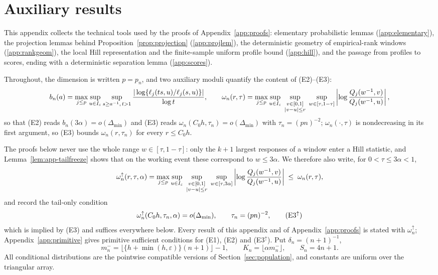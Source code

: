 \section{Auxiliary results}
\label{app:aux}
\renewcommand{\theequation}{A.\arabic{equation}}
\setcounter{equation}{0}

This appendix collects the technical tools used by the proofs of
Appendix~\ref{app:proofs}: elementary probabilistic lemmas
(\ref{app:elementary}), the projection lemmas behind
Proposition~\ref{prop:projection} (\ref{app:projlem}), the deterministic
geometry of empirical-rank windows (\ref{app:rankgeom}), the local Hill
representation and the finite-sample uniform profile bound
(\ref{app:hill}), and the passage from profiles to scores, ending with a
deterministic separation lemma (\ref{app:scores}).

Throughout, the dimension is written $p=p_n$, and two auxiliary moduli
quantify the content of (E2)--(E3):
\[
 b_n(a)=\max_{j\le p}\sup_{u\in I_\varepsilon}\sup_{s\ge a^{-1},\,t>1}
 \frac{|\log\{\ell_j(ts,u)/\ell_j(s,u)\}|}{\log t},
 \qquad
 \omega_n(r,\tau)=\max_{j\le p}
 \sup_{u\in I_\varepsilon}\;
 \sup_{\substack{v\in[0,1]\\|v-u|\le r}}\;
 \sup_{w\in[\tau,1-\tau]}
 \left|\log\frac{Q_j(w^{-1},v)}{Q_j(w^{-1},u)}\right|,
\]
so that (E2) reads $b_n(3\alpha)=o(\Delta_{\min})$ and (E3) reads
$\omega_n(C_0h,\tau_n)=o(\Delta_{\min})$ with $\tau_n=(pn)^{-2}$;
$\omega_n(\cdot,\tau)$ is nondecreasing in its first argument, so (E3)
bounds $\omega_n(r,\tau_n)$ for every $r\le C_0h$.

The proofs below never use the whole range $w\in[\tau,1-\tau]$: only the
$k+1$ largest responses of a window enter a Hill statistic, and
Lemma~\ref{lem:app-tailfreeze} shows that on the working event these
correspond to $w\le3\alpha$.  We therefore also write, for
$0<\tau\le3\alpha<1$,
\begin{equation}\label{eq:omega-up}
 \omega_n^{\uparrow}(r,\tau,\alpha)=\max_{j\le p}
 \sup_{u\in I_\varepsilon}\;
 \sup_{\substack{v\in[0,1]\\|v-u|\le r}}\;
 \sup_{w\in[\tau,3\alpha]}
 \left|\log\frac{Q_j(w^{-1},v)}{Q_j(w^{-1},u)}\right|
 \;\le\;\omega_n(r,\tau),
\end{equation}
and record the tail-only condition
\begin{equation}\label{eq:E3up}
 \omega_n^{\uparrow}(C_0h,\tau_n,\alpha)=o(\Delta_{\min}),
 \qquad\tau_n=(pn)^{-2},
 \tag{E3$^{\uparrow}$}
\end{equation}
which is implied by (E3) and suffices everywhere below.  Every result of
this appendix and of Appendix~\ref{app:proofs} is stated with
$\omega_n^{\uparrow}$; Appendix~\ref{app:primitive} gives primitive
sufficient conditions for (E1), (E2) and (E3$^{\uparrow}$).  Put
$\delta_n=(n+1)^{-1}$,
\[
 m_n^-=\bigl\lfloor\{h+\min(h,\varepsilon)\}(n+1)\bigr\rfloor-1,
 \qquad
 K_n=\lfloor\alpha m_n^-\rfloor,
 \qquad
 S_n=4n+1.
\]
All conditional distributions are the pointwise compatible versions of
Section~\ref{sec:population}, and constants are uniform over the
triangular array.

